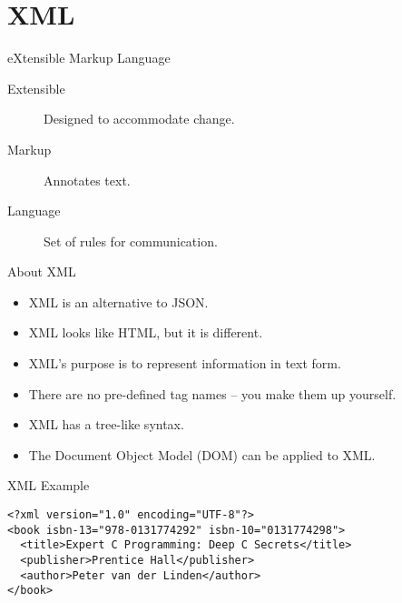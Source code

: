 \section{XML}

\begin{frame}{eXtensible Markup Language}
  \begin{description}
    \item[Extensible] Designed to accommodate change.
    \vspace{0.25cm}
    \item[Markup] Annotates text.
    \vspace{0.25cm}
    \item[Language] Set of rules for communication.
  \end{description}
\end{frame}


\begin{frame}{About XML}
  \begin{itemize}
    \item XML is an alternative to JSON.
    \item XML looks like HTML, but it is different.
    \item XML's purpose is to represent information in text form.
    \item There are no pre-defined tag names -- you make them up yourself.
    \item XML has a tree-like syntax.
    \item The Document Object Model (DOM) can be applied to XML.
  \end{itemize}
\end{frame}

\begin{frame}[fragile]{XML Example}
  \begin{verbatim}
<?xml version="1.0" encoding="UTF-8"?>
<book isbn-13="978-0131774292" isbn-10="0131774298">
  <title>Expert C Programming: Deep C Secrets</title>
  <publisher>Prentice Hall</publisher>
  <author>Peter van der Linden</author>
</book>
  \end{verbatim}
\end{frame}

